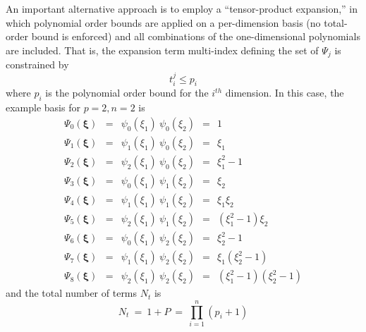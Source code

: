 An important alternative approach is to employ a ``tensor-product
expansion,'' in which polynomial order bounds are applied on a
per-dimension basis (no total-order bound is enforced) and all
combinations of the one-dimensional polynomials are included.  That
is, the expansion term multi-index defining the set of $\Psi_j$ is
constrained by
\begin{equation}
t_i^j \leq p_i \label{eq:tp_multi_index}
\end{equation}
where $p_i$ is the polynomial order bound for the $i^{th}$ dimension.
In this case, the example basis for $p = 2, n = 2$ is
\begin{eqnarray}
\Psi_0(\boldsymbol{\xi}) & = & \psi_0(\xi_1) ~ \psi_0(\xi_2) ~~=~~ 1 
\nonumber \\
\Psi_1(\boldsymbol{\xi}) & = & \psi_1(\xi_1) ~ \psi_0(\xi_2) ~~=~~ \xi_1 
\nonumber \\
\Psi_2(\boldsymbol{\xi}) & = & \psi_2(\xi_1) ~ \psi_0(\xi_2) ~~=~~ \xi_1^2 - 1
\nonumber \\
\Psi_3(\boldsymbol{\xi}) & = & \psi_0(\xi_1) ~ \psi_1(\xi_2) ~~=~~ \xi_2
\nonumber \\
\Psi_4(\boldsymbol{\xi}) & = & \psi_1(\xi_1) ~ \psi_1(\xi_2) ~~=~~ \xi_1 \xi_2 
\nonumber \\
\Psi_5(\boldsymbol{\xi}) & = & \psi_2(\xi_1) ~ \psi_1(\xi_2) ~~=~~ 
(\xi_1^2 - 1) \xi_2 \nonumber \\
\Psi_6(\boldsymbol{\xi}) & = & \psi_0(\xi_1) ~ \psi_2(\xi_2) ~~=~~ \xi_2^2 - 1 
\nonumber \\
\Psi_7(\boldsymbol{\xi}) & = & \psi_1(\xi_1) ~ \psi_2(\xi_2) ~~=~~ 
\xi_1 (\xi_2^2 - 1) \nonumber \\
\Psi_8(\boldsymbol{\xi}) & = & \psi_2(\xi_1) ~ \psi_2(\xi_2) ~~=~~ 
(\xi_1^2 - 1) (\xi_2^2 - 1) \nonumber
\end{eqnarray}
and the total number of terms $N_t$ is
\begin{equation}
N_t ~=~ 1 + P ~=~ \prod_{i=1}^{n} (p_i + 1) \label{eq:num_tp_terms}
\end{equation}

